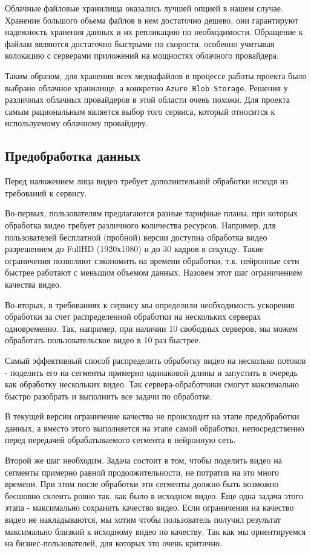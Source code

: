 Облачные файловые хранилища оказались лучшей опцией в нашем случае. Хранение большого обьема файлов в нем достаточно дешево, они гарантируют надежность хранения данных и их репликацию по необходимости. Обращение к файлам являются достаточно быстрыми по скорости, особенно учитывая колокацию с серверами приложений на мощностях облачного провайдера.

Таким образом, для хранения всех медиафайлов в процессе работы проекта было выбрано облачное хранилище, а конкретно \texttt{Azure Blob Storage}. Решения у различных облачных провайдеров в этой области очень похожи. Для проекта самым рациональным является выбор того сервиса, который относится к используемому облачному провайдеру.

\subsection{Предобработка данных}

Перед наложением лица видео требует дополнительной обработки исходя из требований к сервису.

Во-первых, пользователям предлагаются разные тарифные планы, при которых обработка видео требует различного количества ресурсов. Например, для пользователей бесплатной (пробной) версии доступна обработка видео разрешением до FullHD (1920х1080) и до 30 кадров в секунду. Такие ограничения позволяют сэкономить на времени обработки, т.к. нейронные сети быстрее работают с меньшим объемом данных. Назовем этот шаг ограничением качества видео.

Во-вторых, в требованиях к сервису мы определили необходимость ускорения обработки за счет распределенной обработки на нескольких серверах одновременно. Так, например, при наличии 10 свободных серверов, мы можем обработать пользовательское видео в 10 раз быстрее.

Самый эффективный способ распределить обработку видео на несколько потоков - поделить его на сегменты примерно одинаковой длины и запустить в очередь как обработку нескольких видео. Так сервера-обработчики смогут максимально быстро разобрать и выполнить все задачи по обработке.

В текущей версии ограничение качества не происходит на этапе предобработки данных, а вместо этого выполняется на этапе самой обработки, непосредственно перед передачей обрабатываемого сегмента в нейронную сеть.

Второй же шаг необходим. Задача состоит в том, чтобы поделить видео на сегменты примерно равной продолжительности, не потратив на это много времени. При этом после обработки эти сегменты должно быть возможно бесшовно склеить ровно так, как было в исходном видео. Еще одна задача этого этапа - максимально сохранить качество видео. Если ограничения на качество видео не накладываются, мы хотим чтобы пользователь получил результат максимально близкий к исходному видео по качеству. Так как мы ориентируемся на бизнес-пользователей, для которых это очень критично.


